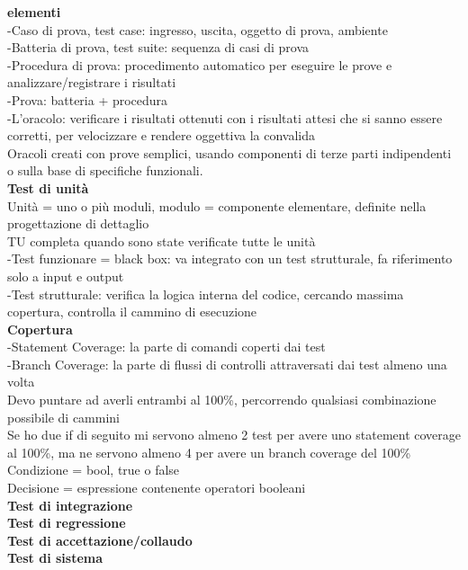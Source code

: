 \documentclass{article}
\begin{document}
				
				\textbf{elementi}\\
				-Caso di prova, test case: ingresso, uscita, oggetto di prova, ambiente\\
				-Batteria di prova, test suite: sequenza di casi di prova\\
				-Procedura di prova: procedimento automatico per eseguire le prove e analizzare/registrare i risultati\\
				-Prova: batteria + procedura\\
				-L'oracolo: verificare i risultati ottenuti con i risultati attesi che si sanno essere corretti, per velocizzare e rendere oggettiva la convalida\\
				Oracoli creati con prove semplici, usando componenti di terze parti indipendenti o sulla base di specifiche funzionali.\\
				
				
				\textbf{Test di unità}\\
				Unità = uno o più moduli, modulo = componente elementare, definite nella progettazione di dettaglio\\
				TU completa quando sono state verificate tutte le unità\\
				-Test funzionare = black box: va integrato con un test strutturale, fa riferimento solo a input e output\\
				-Test strutturale: verifica la logica interna del codice, cercando massima copertura, controlla il cammino di esecuzione\\
				
				\textbf{Copertura}\\
				-Statement Coverage: la parte di comandi coperti dai test\\
				-Branch Coverage: la parte di flussi di controlli attraversati dai test almeno una volta\\
				Devo puntare ad averli entrambi al 100\%, percorrendo qualsiasi combinazione possibile di cammini\\
				
				Se ho due if di seguito mi servono almeno 2 test per avere uno statement coverage al 100\%, ma ne servono almeno 4 per avere un branch coverage del 100\%\\
				
				Condizione = bool, true o false\\
				Decisione = espressione contenente operatori booleani\\
				
				\textbf{Test di integrazione}\\
				
				\textbf{Test di regressione}\\
				
				
				\textbf{Test di accettazione/collaudo}\\
				
				
				\textbf{Test di sistema}\\
				
				
\end{document}
